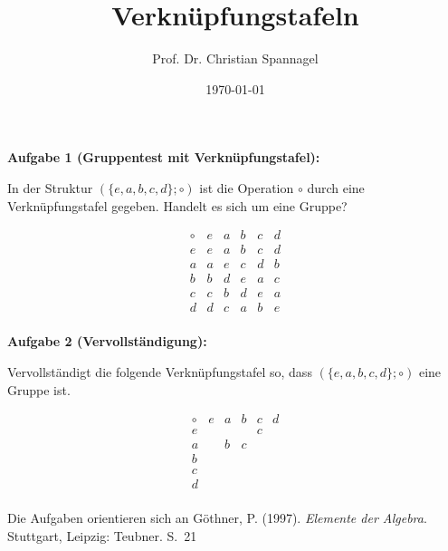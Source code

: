 \documentclass{../cssheet}
\title{Verknüpfungstafeln}
\author{Prof. Dr. Christian Spannagel}
\date{\today}
\begin{document}
\printtitle


\textbf{Aufgabe 1 (Gruppentest mit Verknüpfungstafel):} 

In der Struktur $(\{e,a,b,c,d\};\circ)$ ist die Operation $\circ$ durch eine Verknüpfungstafel gegeben. Handelt es sich um eine Gruppe?

\[
\begin{array}{c|ccccc}
\circ & e & a & b & c & d \\
\hline
e & e & a & b & c & d \\
a & a & e & c & d & b \\
b & b & d & e & a & c \\
c & c & b & d & e & a \\
d & d & c & a & b & e \\
\end{array}
\]

\textbf{Aufgabe 2 (Vervollständigung):} 

Vervollständigt die folgende Verknüpfungstafel so, dass $(\{e,a,b,c,d\};\circ)$ eine Gruppe ist.

\[
\begin{array}{c|ccccc}
\circ & e & a & b & c & d \\
\hline
e &  &  &  & c &  \\
a &  & b & c &  &  \\
b &  &  &  &  &  \\
c &  &  &  &  &  \\
d &  &  &  &  &  \\
\end{array}
\]

\vspace*{2cm}
Die Aufgaben orientieren sich an Göthner, P. (1997). \emph{Elemente der Algebra}. Stuttgart, Leipzig: Teubner. S.~21

\vspace*{2cm}
\printlicense

\printsocials
\end{document}
